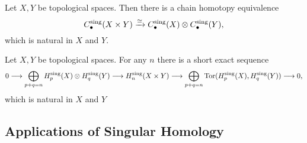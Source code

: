 
	\begin{theorem}
		Let $X,Y$ be topological spaces. Then there is a chain homotopy equivalence
		\begin{equation*}
			C_\bullet^\text{sing}(X \times Y) \xrightarrow{\simeq} C_\bullet^\text{sing}(X) \otimes C_\bullet^\text{sing}(Y),
		\end{equation*}
		which is natural in $X$ and $Y$.
	\end{theorem}

	\begin{corollary}
		Let $X,Y$ be topological spaces. For any $n$ there is a short exact sequence
		\begin{align*}
			0 --> \bigoplus \limits_{p+q=n}H_p^\text{sing}(X) \otimes H_q^\text{sing}(Y) --> H_n^\text{sing}(X \times Y) --> \bigoplus \limits_{p+q=n} \operatorname{Tor}(H_p^\text{sing}(X),H_q^\text{sing}(Y)) --> 0,
		\end{align*}
		which is natural in $X$ and $Y$ 
	\end{corollary}

	\newpage
	\subsection{Applications of Singular Homology}

